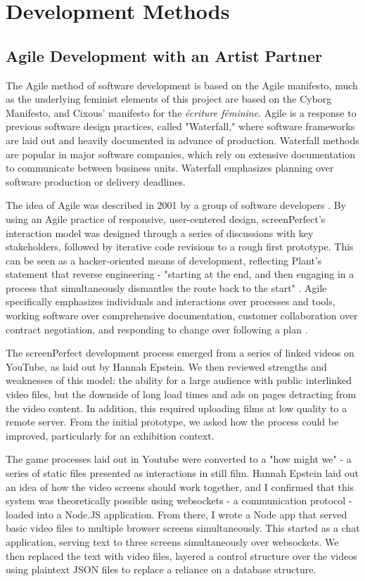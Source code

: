 \section{Development Methods}
\subsection{ Agile Development with an Artist Partner}
The Agile method of software development is based on the Agile manifesto, much as the underlying feminist elements of this project are based on the Cyborg Manifesto, and Cixous' manifesto for the \textit{\'{e}criture f\'{e}minine}. Agile is a response to previous software design practices, called "Waterfall," where software frameworks are laid out and heavily documented in advance of production. Waterfall methods are popular in major software companies, which rely on extensive documentation to communicate between business units. Waterfall emphasizes planning over software production or delivery deadlines. 

The idea of Agile was described in 2001 by a group of software developers \parencite{agile}. By using an Agile practice of responsive, user-centered design, screenPerfect's interaction model was designed through a series of discussions with key stakeholders, followed by iterative code revisions to a rough first prototype. This can be seen as a hacker-oriented means of development, reflecting Plant's statement that reverse engineering - "starting at the end, and then engaging in a process that simultaneously dismantles the route back to the start" \parencite{plant}. Agile specifically emphasizes individuals and interactions over processes and tools, working software over comprehensive documentation, customer collaboration over contract negotiation, and responding to change over following a plan \parencite{agile}. 

The screenPerfect development process emerged from a series of linked videos on YouTube, as laid out by Hannah Epstein. We then reviewed strengths and weaknesses of this model: the ability for a large audience with public interlinked video files, but the downside of long load times and ads on pages detracting from the video content. In addition, this required uploading films at low quality to a remote server. From the initial prototype, we asked how the process could be improved, particularly for an exhibition context. 

The game processes laid out in Youtube were converted to a "how might we" - a series of static files presented as interactions in still film. Hannah Epstein laid out an idea of how the video screens should work together, and I confirmed that this system was theoretically possible using websockets - a communication protocol - loaded into a Node.JS application. From there, I wrote a Node app that served basic video files to multiple browser screens simultaneously. This started as a chat application, serving text to three screens simultaneously over websockets. We then replaced the text with video files, layered a control structure over the videos using plaintext JSON files to replace a reliance on a database structure.

